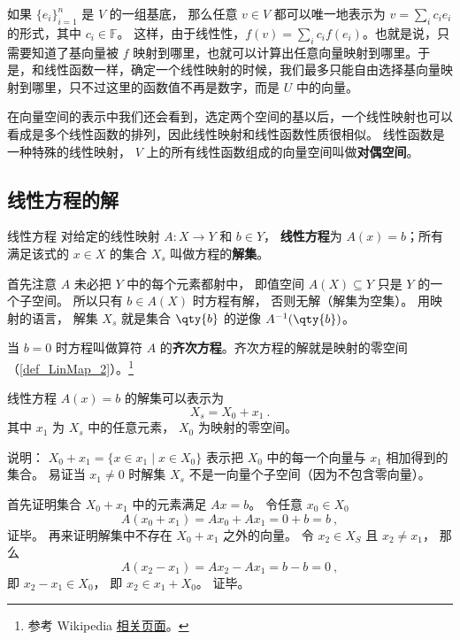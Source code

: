如果 $\{{e}_i\}_{i=1}^n$ 是 $V$ 的一组基底， 那么任意 $v\in V$ 都可以唯一地表示为 $v=\sum_i c_i {e}_i$ 的形式，其中 $c_i\in\mathbb{F}$。 这样，由于线性性，$f(v)=\sum_ic_if({e}_i)$。也就是说，只需要知道了基向量被 $f$ 映射到哪里，也就可以计算出任意向量映射到哪里。于是，和线性函数一样，确定一个线性映射的时候，我们最多只能自由选择基向量映射到哪里，只不过这里的函数值不再是数字，而是 $U$ 中的向量。

在向量空间的表示中我们还会看到，选定两个空间的基以后，一个线性映射也可以看成是多个线性函数的排列，因此线性映射和线性函数性质很相似。 线性函数是一种特殊的线性映射， $V$ 上的所有线性函数组成的向量空间叫做\textbf{对偶空间}。



\subsection{线性方程的解}

\begin{definition}{线性方程}
对给定的线性映射 $A:X\to Y$ 和 $b \in Y$， \textbf{线性方程}为 $A (x) = b$；所有满足该式的 $x \in X$ 的集合 $X_s$ 叫做方程的\textbf{解集}。
\end{definition}

首先注意 $A$ 未必把 $Y$ 中的每个元素都射中， 即值空间 $A(X) \subseteq Y$ 只是 $Y$ 的一个子空间。 所以只有 $b \in A(X)$ 时方程有解， 否则无解（解集为空集）。 用映射的语言， 解集 $X_s$ 就是集合 $\qty{b}$ 的逆像 $A^{-1}(\qty{b})$。

当 $b = 0$ 时方程叫做算符 $A$ 的\textbf{齐次方程}。齐次方程的解就是映射的零空间（\autoref{def_LinMap_2}）。\footnote{参考 Wikipedia \href{https://en.wikipedia.org/wiki/Kernel_(linear_algebra)}{相关页面}。}

\begin{theorem}{}
线性方程 $A (x) = b$ 的解集可以表示为
\begin{equation}
X_s = X_0 + x_1~.
\end{equation}
其中 $x_1$ 为 $X_s$ 中的任意元素，  $X_0$ 为映射的零空间。
\end{theorem}
说明： $X_0 + x_1 = \{x \in x_1 \mid x \in X_0\}$ 表示把 $X_0$ 中的每一个向量与 $x_1$ 相加得到的集合。 易证当 $x_1 \ne 0$ 时解集 $X_s$ 不是一向量个子空间（因为不包含零向量）。

首先证明集合 $X_0 + x_1$ 中的元素满足 $Ax = b$。 令任意 $x_0 \in X_0$
\begin{equation}
A(x_0 + x_1) = Ax_0 + Ax_1 = 0 + b = b~,
\end{equation}
证毕。 再来证明解集中不存在 $X_0 + x_1$ 之外的向量。 令 $x_2 \in X_S$ 且 $x_2 \ne x_1$， 那么
\begin{equation}
A(x_2 - x_1) = Ax_2 - Ax_1 = b - b = 0~,
\end{equation}
即 $x_2 - x_1 \in X_0$， 即 $x_2 \in x_1 + X_0$。 证毕。

